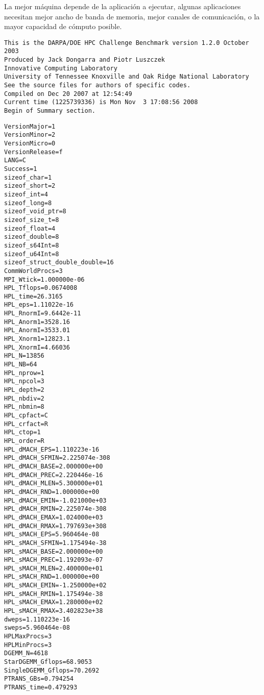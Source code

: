 \documentclass[a4paper]{report}
\begin{document}
La mejor m\'aquina depende de la aplicaci\'on a ejecutar, algunas aplicaciones necesitan mejor ancho de banda de
memoria, mejor canales de comunicaci\'on, o la mayor capacidad de c\'omputo posible.

\begin{verbatim}
This is the DARPA/DOE HPC Challenge Benchmark version 1.2.0 October 2003
Produced by Jack Dongarra and Piotr Luszczek
Innovative Computing Laboratory
University of Tennessee Knoxville and Oak Ridge National Laboratory
See the source files for authors of specific codes.
Compiled on Dec 20 2007 at 12:54:49
Current time (1225739336) is Mon Nov  3 17:08:56 2008
Begin of Summary section.
\end{verbatim}

\begin{minipage}[b]{0.5\linewidth}
\begin{verbatim}
VersionMajor=1
VersionMinor=2
VersionMicro=0
VersionRelease=f
LANG=C
Success=1
sizeof_char=1
sizeof_short=2
sizeof_int=4
sizeof_long=8
sizeof_void_ptr=8
sizeof_size_t=8
sizeof_float=4
sizeof_double=8
sizeof_s64Int=8
sizeof_u64Int=8
sizeof_struct_double_double=16
CommWorldProcs=3
MPI_Wtick=1.000000e-06
HPL_Tflops=0.0674008
HPL_time=26.3165
HPL_eps=1.11022e-16
HPL_RnormI=9.6442e-11
HPL_Anorm1=3528.16
HPL_AnormI=3533.01
HPL_Xnorm1=12823.1
HPL_XnormI=4.66036
HPL_N=13856
HPL_NB=64
HPL_nprow=1
HPL_npcol=3
HPL_depth=2
HPL_nbdiv=2
HPL_nbmin=8
HPL_cpfact=C
HPL_crfact=R
HPL_ctop=1
HPL_order=R
HPL_dMACH_EPS=1.110223e-16
HPL_dMACH_SFMIN=2.225074e-308
HPL_dMACH_BASE=2.000000e+00
HPL_dMACH_PREC=2.220446e-16
HPL_dMACH_MLEN=5.300000e+01
HPL_dMACH_RND=1.000000e+00
HPL_dMACH_EMIN=-1.021000e+03
HPL_dMACH_RMIN=2.225074e-308
HPL_dMACH_EMAX=1.024000e+03
HPL_dMACH_RMAX=1.797693e+308
HPL_sMACH_EPS=5.960464e-08
HPL_sMACH_SFMIN=1.175494e-38
HPL_sMACH_BASE=2.000000e+00
HPL_sMACH_PREC=1.192093e-07
HPL_sMACH_MLEN=2.400000e+01
HPL_sMACH_RND=1.000000e+00
HPL_sMACH_EMIN=-1.250000e+02
HPL_sMACH_RMIN=1.175494e-38
HPL_sMACH_EMAX=1.280000e+02
HPL_sMACH_RMAX=3.402823e+38
dweps=1.110223e-16
sweps=5.960464e-08
HPLMaxProcs=3
HPLMinProcs=3
DGEMM_N=4618
StarDGEMM_Gflops=68.9053
SingleDGEMM_Gflops=70.2692
PTRANS_GBs=0.794254
PTRANS_time=0.479293
\end{verbatim}
\end{minipage}
\hspace{0.5cm}
\end{document}
